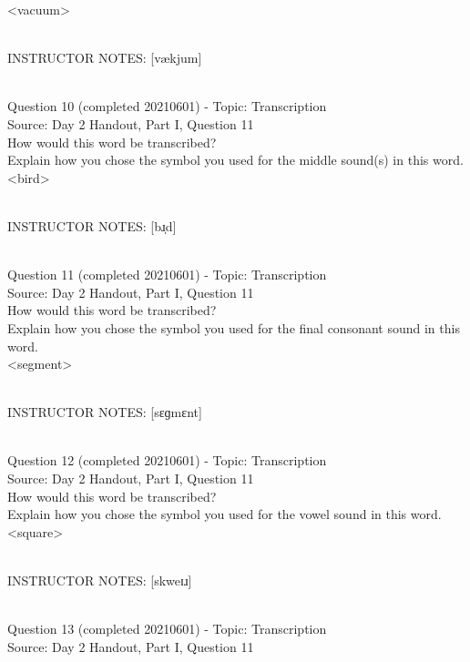 \documentclass[12pt]{article}
\begin{document}
<vacuum>


~\\
INSTRUCTOR NOTES: [vækjum]


~\\

{\large Question 10} (completed 20210601) - Topic: Transcription\\
Source: Day 2 Handout, Part I, Question 11\\

How would this word be transcribed?\\ Explain how you chose the symbol you used for the middle sound(s) in this word.\\

<bird>


~\\
INSTRUCTOR NOTES: [bɹ̩d]


~\\

{\large Question 11} (completed 20210601) - Topic: Transcription\\
Source: Day 2 Handout, Part I, Question 11\\

How would this word be transcribed?\\ Explain how you chose the symbol you used for the final consonant sound in this word.\\

<segment>


~\\
INSTRUCTOR NOTES: [sɛɡmɛnt]


~\\

{\large Question 12} (completed 20210601) - Topic: Transcription\\
Source: Day 2 Handout, Part I, Question 11\\

How would this word be transcribed?\\ Explain how you chose the symbol you used for the vowel sound in this word.\\

<square>


~\\
INSTRUCTOR NOTES: [skweɪɹ]


~\\

{\large Question 13} (completed 20210601) - Topic: Transcription\\
Source: Day 2 Handout, Part I, Question 11\\
\end{document}
